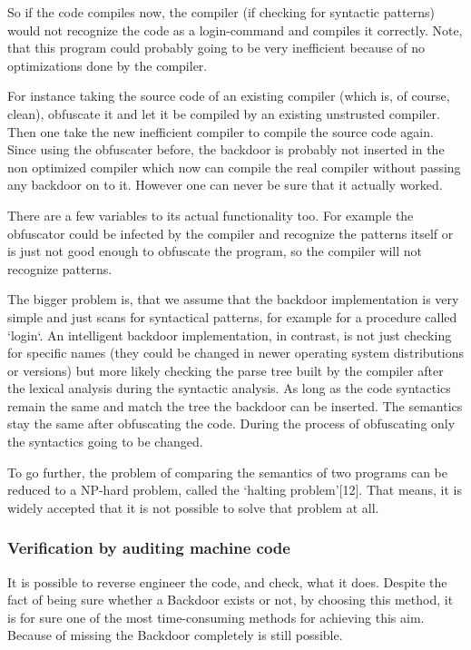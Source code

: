 \documentclass[a4paper, 12pt]{article}
\begin{document}
So if the code compiles now, the compiler (if checking for syntactic patterns) would not recognize the code as a login-command and compiles it correctly. Note, that this program could probably going to be very inefficient because of no optimizations done by the compiler.

For instance taking the source code of an existing compiler (which is, of course, clean), obfuscate it and let it be compiled by an existing unstrusted compiler.
Then one take the new inefficient compiler to compile the source code again. Since using the obfuscater before, the backdoor is probably not inserted in the non optimized compiler which now can compile the real compiler without passing any backdoor on to it.
However one can never be sure that it actually worked.

There are a few variables to its actual functionality too. For example the obfuscator could be infected by the compiler and recognize the patterns itself or is just not good enough to obfuscate the program, so the compiler will not recognize patterns.

The bigger problem is, that we assume that the backdoor implementation is very simple and just scans for syntactical patterns, for example for a procedure called `login`. 
An intelligent backdoor implementation, in contrast, is not just checking for specific names (they could be changed in newer operating system distributions or versions) but more likely checking the parse tree built by the compiler after the lexical analysis during the syntactic analysis. As long as the code syntactics remain the same and match the tree the backdoor can be inserted. The semantics stay the same after obfuscating the code. During the process of obfuscating only the syntactics going to be changed.

To go further, the problem of comparing the semantics of two programs can be reduced to a NP-hard problem, called the `halting problem'[12].
That means, it is widely accepted that it is not possible to solve that problem at all.

\subsubsection{Verification by auditing machine code}

It is possible to reverse engineer the code, and check, what it does. Despite the fact of being sure whether a Backdoor exists or not, by choosing this method, it is for sure one of the most time-consuming methods for achieving this aim.
Because of missing the Backdoor completely is still possible.
\end{document}

